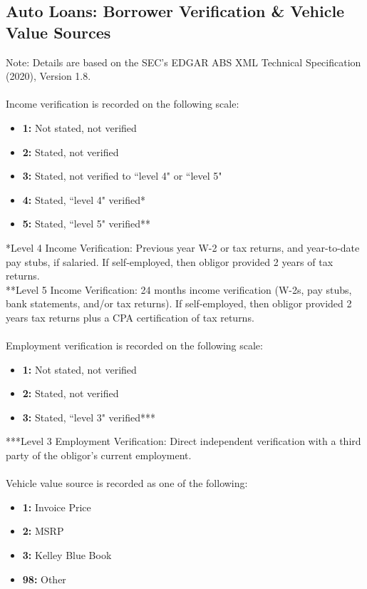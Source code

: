 \documentclass[10.5pt]{article}
\begin{document}
\subsection{Auto Loans: Borrower Verification \& Vehicle Value Sources}
Note: Details are based on the SEC's EDGAR ABS XML Technical Specification (2020), Version 1.8. \\\\
Income verification is recorded on the following scale:
\begin{itemize} [label=$ $, leftmargin=*]
    \item\textbf{1:} Not stated, not verified
    \item\textbf{2:} Stated, not verified
    \item\textbf{3:} Stated, not verified to ``level 4" or ``level 5"
    \item\textbf{4:} Stated, ``level 4" verified*
    \item\textbf{5:} Stated, ``level 5" verified**
\end{itemize}
*Level 4 Income Verification: Previous year W-2 or tax returns, and year-to-date pay stubs, if salaried. If self-employed, then obligor provided 2 years of tax returns. \\
**Level 5 Income Verification: 24 months income verification (W-2s, pay stubs, bank statements, and/or tax returns). If self-employed, then obligor provided 2 years tax returns plus a CPA certification of tax returns. \\\\
Employment verification is recorded on the following scale: 
\begin{itemize} [label=$ $, leftmargin=*]
    \item\textbf{1:} Not stated, not verified
    \item\textbf{2:} Stated, not verified
    \item\textbf{3:} Stated, ``level 3" verified***
\end{itemize}
***Level 3 Employment Verification: Direct independent verification with a third party of the obligor's current employment. \\\\
Vehicle value source is recorded as one of the following:
\begin{itemize} [label=$ $, leftmargin=*]
    \item\textbf{1:} Invoice Price 
    \item\textbf{2:} MSRP
    \item\textbf{3:} Kelley Blue Book
    \item\textbf{98:} Other
\end{itemize}
\end{document}
